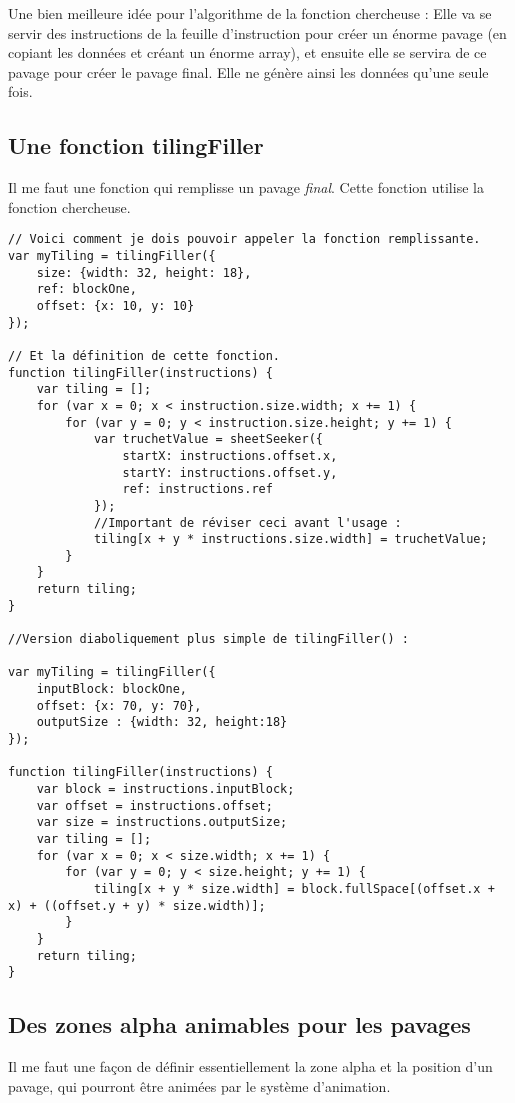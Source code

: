 Une bien meilleure idée pour l'algorithme de la fonction chercheuse : Elle va se servir des instructions de la feuille d'instruction pour créer un énorme pavage (en copiant les données et créant un énorme array), et ensuite elle se servira de ce pavage pour créer le pavage final. Elle ne génère ainsi les données qu'une seule fois.

\subsection{Une fonction tilingFiller}
Il me faut une fonction qui remplisse un pavage \textit{final}. Cette fonction utilise la fonction chercheuse.
\begin{lstlisting}
// Voici comment je dois pouvoir appeler la fonction remplissante.
var myTiling = tilingFiller({
    size: {width: 32, height: 18},
    ref: blockOne,
    offset: {x: 10, y: 10}
});

// Et la définition de cette fonction.
function tilingFiller(instructions) {
    var tiling = [];
    for (var x = 0; x < instruction.size.width; x += 1) {
        for (var y = 0; y < instruction.size.height; y += 1) {
            var truchetValue = sheetSeeker({
                startX: instructions.offset.x,
                startY: instructions.offset.y,
                ref: instructions.ref
            });
            //Important de réviser ceci avant l'usage :
            tiling[x + y * instructions.size.width] = truchetValue;
        }
    }
    return tiling;
}

//Version diaboliquement plus simple de tilingFiller() :

var myTiling = tilingFiller({
    inputBlock: blockOne,
    offset: {x: 70, y: 70},
    outputSize : {width: 32, height:18}
});

function tilingFiller(instructions) {
    var block = instructions.inputBlock;
    var offset = instructions.offset;
    var size = instructions.outputSize;
    var tiling = [];
    for (var x = 0; x < size.width; x += 1) {
        for (var y = 0; y < size.height; y += 1) {
            tiling[x + y * size.width] = block.fullSpace[(offset.x + x) + ((offset.y + y) * size.width)];
        }
    }
    return tiling;
}
\end{lstlisting}
\subsection{Des zones alpha animables pour les pavages}

Il me faut une façon de définir essentiellement la zone alpha et la position d'un pavage, qui pourront être animées par le système d'animation.